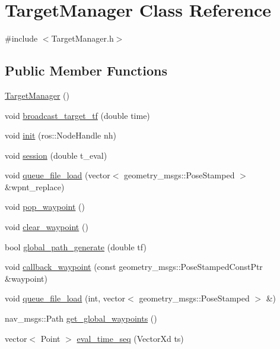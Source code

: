 \hypertarget{class_target_manager}{}\section{Target\+Manager Class Reference}
\label{class_target_manager}


{\ttfamily \#include $<$Target\+Manager.\+h$>$}

\subsection*{Public Member Functions}
\begin{DoxyCompactItemize}
\item 
\hyperlink{class_target_manager_a3c7f0783381de386b697d8f27846aed1}{Target\+Manager} ()
\item 
void \hyperlink{class_target_manager_a2f60f20f32700c71852fea340cdf1240}{broadcast\+\_\+target\+\_\+tf} (double time)
\item 
void \hyperlink{class_target_manager_a293bcb3b559c6e7c4ef549873791f092}{init} (ros\+::\+Node\+Handle nh)
\item 
void \hyperlink{class_target_manager_a4af88c70bb8a0af0171ee9a49536d5c0}{session} (double t\+\_\+eval)
\item 
void \hyperlink{class_target_manager_a8b96689879cecac3d9109914eb6230ef}{queue\+\_\+file\+\_\+load} (vector$<$ geometry\+\_\+msgs\+::\+Pose\+Stamped $>$ \&wpnt\+\_\+replace)
\item 
void \hyperlink{class_target_manager_af362d78ae6b0cc0a3ea288b2c138f482}{pop\+\_\+waypoint} ()
\item 
void \hyperlink{class_target_manager_a13242c4a8b96b97cfeddea19aabc1181}{clear\+\_\+waypoint} ()
\item 
bool \hyperlink{class_target_manager_a1c0e48d7a623e8b7caa11c6b1832956b}{global\+\_\+path\+\_\+generate} (double tf)
\item 
void \hyperlink{class_target_manager_adc84c02e4501b1a53556c766d50bc8b5}{callback\+\_\+waypoint} (const geometry\+\_\+msgs\+::\+Pose\+Stamped\+Const\+Ptr \&waypoint)
\item 
void \hyperlink{class_target_manager_a861a5feb4828c3174308781eb0efc915}{queue\+\_\+file\+\_\+load} (int, vector$<$ geometry\+\_\+msgs\+::\+Pose\+Stamped $>$ \&)
\item 
nav\+\_\+msgs\+::\+Path \hyperlink{class_target_manager_a747b82bf5cb4d1d3574dbc08a117538f}{get\+\_\+global\+\_\+waypoints} ()
\item 
vector$<$ Point $>$ \hyperlink{class_target_manager_a63bbc724844890316a654380d0354e93}{eval\+\_\+time\+\_\+seq} (Vector\+Xd ts)
\end{DoxyCompactItemize}
